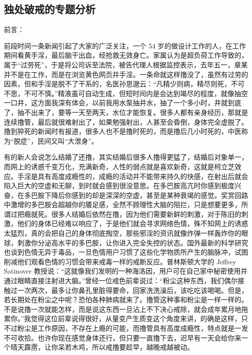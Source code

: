 \subsection{独处破戒的专题分析}

前言：

前段时间一条新闻引起了大家的广泛关注，一个 54 岁的做设计工作的人，在工作期间看黄手淫，最后脑干出血，经抢救无效身亡。家属认为是超负荷工作导致的，属于“过劳死”，于是将公司诉至法院，被告代理人根据监控表示，去年五一，章某并不是在工作，而是在浏览黄色网页并手淫。一条命就这样撸没了，虽然有过劳的因素，但和手淫是脱不了干系的，名医孙思邈云：“凡精少则病，精尽则死，不可不思，不可不慎。”精液虽可自动生成，但短时间内是会达到竭尽的程度，就像抽空一口井，这方面我深有体会，以前我用水泵抽井水，抽了一个多小时，井就到底了，抽不出来了，要等一天至两天，水位才能恢复。很多人都有亲身经历，那就是连续撸管，最后就很难射出了，如果勉强射出，人甚至会昏倒，身体完全虚脱了。撸到猝死的新闻时有报道，很多人也不是撸时死的，而是撸后几小时死的，中医称为“脱症”，民间又叫“大泄身”。

有的新人会说怎么结婚了还撸，其实结婚后很多人撸得更猛了，结婚后对象单一，而网上的诱惑千变万化，充满新奇，人性的弱点就是喜欢新奇，这就是柯立芝效应。手淫是具有高度成瘾性的，成瘾的活动并不能带来持久的快感，在射出后就会陷入巨大的空虚和无聊，到时就会感到很没意思。在多巴胺高亢时你感到极度兴奋，在多巴胺下降后你感到的却是深深的空虚，甚至是某种衰竭的感觉。奖赏回路中激增的多巴胺会超越你的餍足感，全然不顾理性大脑的阻拦，只是想要更多，所谓过把瘾就死。很多人结婚后依然在撸，因为他们需要新鲜的刺激，对于陈旧的刺激，他们的身体已经难以响应了，于是他们就会寻求网络色情，殊不知网上的诱惑太猛烈，真的会把自己的身体彻底掏空，那些邪淫的资讯就像炸弹一样轰炸你的眼球，刺激你分泌高水平的多巴胺，让你进入完全失控的状态。国外最新的科学研究也谈到色情无异于毒品，一旦色情用户习惯了这些化学物质所产生的脑脉冲，试图削减他们观看色情的习惯会带来戒毒一样的戒断反应。普林斯顿大学的 Jeffrey Satinover 教授说：“这就像我们发明的一种海洛因，用户可在自己家中秘密使用并通过眼睛直接注射进大脑。”曾经一位戒色前辈说过：“粉尘这种东西，我们偶尔接触过一次两次，最多让你鼻孔里脏得要命，回家洗洗澡后，该吃吃该喝喝。但是，若长期处在粉尘之中呢？恐怕各种肺病就来了。撸管这种事和粉尘是一样一样的。不是说撸一次就能怎样，而是说这东西一旦沾上不下决心戒除，就会成年累月地拖累你。”我觉得这位前辈说得很好，从量变产生质变这个角度来讲，的确是这样，只不过粉尘是工作原因，不存在上瘾的可能，而撸管具有高度成瘾性，特点就是一发不可收拾。也许你现在感觉身体还行，但只要一直撸下去，迟早有一天会给你来一个晴天霹雳，让你呆若木鸡，所以戒撸要趁早，越晚戒越被动。

